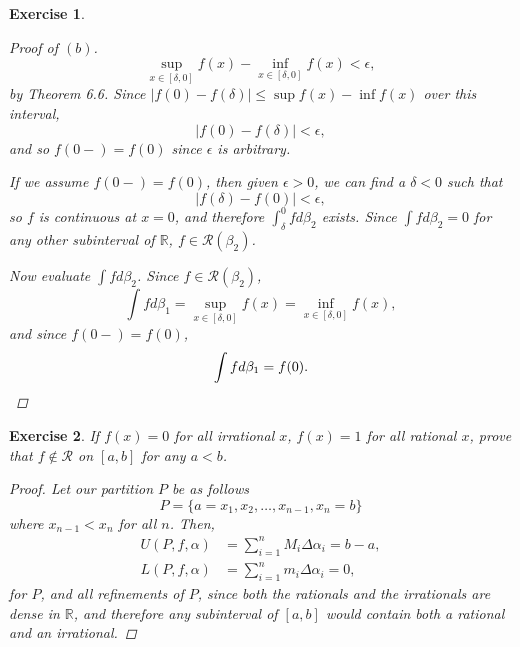 \documentclass[10pt,letterpaper]{amsart}
\newtheorem{exercise}{Exercise}[section]
\theoremstyle{definition}
\theoremstyle{remark}
\numberwithin{equation}{exercise}
\begin{document}
\begin{multicols}{2}
\begin{exercise}
\begin{proof}[Proof of $(b)$]
\begin{equation*}
        \sup_{x \in [\delta,0]} f(x) - \inf_{x \in [\delta,0]} f(x) < \epsilon,
      \end{equation*}
      by Theorem 6.6. Since $|f(0) - f(\delta)| \le \sup f(x) - \inf f(x)$ over this interval,
      \begin{equation*}
        |f(0) - f(\delta)| < \epsilon,
      \end{equation*}
      and so $f(0-) = f(0)$ since $\epsilon$ is arbitrary.
      \par If we assume $f(0-) = f(0)$, then given $\epsilon > 0$, we can find a $\delta < 0$ such that
      \begin{equation*}
        |f(\delta) - f(0)| < \epsilon,
      \end{equation*}
      so $f$ is continuous at $x = 0$, and therefore $\int_\delta^0 f d\beta_2$ exists. Since $\int f d\beta_2 = 0$ for any other subinterval of $\mathbb{R}$, $f \in \mathscr{R}(\beta_2)$.
      \par Now evaluate $\int f d\beta_2$. Since $f \in \mathscr{R}(\beta_2)$,
      \begin{equation*}
        \int f d\beta_1 = \sup_{x \in [\delta,0]} f(x) = \inf_{x \in [\delta,0]} f(x),
      \end{equation*}
      and since $f(0-) = f(0)$,
      \begin{equation*}
        \int f d\beta_1 = f(0).\qedhere
      \end{equation*}
    \end{proof}
  \end{exercise}
  \setcounter{exercise}{3}
  \begin{exercise}\label{6.4}
    If $f(x) = 0$ for all irrational $x$, $f(x) = 1$ for all rational $x$, prove that $f \notin \mathscr{R}$ on $[a,b]$ for any $a < b$.
    \begin{proof}
      Let our partition $P$ be as follows
      \begin{equation*}
        P = \{a=x_1,x_2,\ldots,x_{n-1},x_n = b\}
      \end{equation*}
      where $x_{n-1} < x_n$ for all $n$. Then,
      \begin{align*}
        U(P,f,\alpha) &= \sum_{i=1}^n M_i \Delta \alpha_i = b-a,\\
        L(P,f,\alpha) &= \sum_{i=1}^n m_i \Delta \alpha_i = 0,
      \end{align*}
      for $P$, and all refinements of $P$, since both the rationals and the irrationals are dense in $\mathbb{R}$, and therefore any subinterval of $[a,b]$ would contain both a rational and an irrational.
    \end{proof}
  \end{exercise}

\end{multicols}
\end{document}
